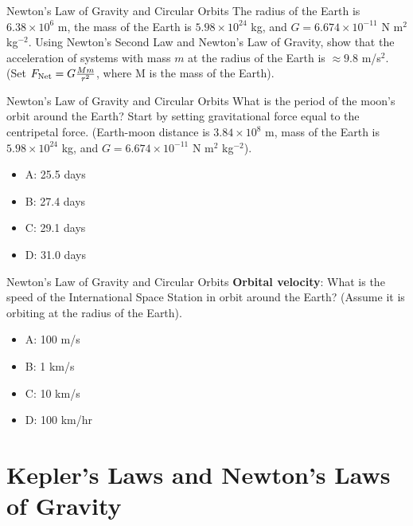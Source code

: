 \documentclass{beamer}
\begin{document}
\begin{frame}{Newton's Law of Gravity and Circular Orbits}
The radius of the Earth is $6.38\times 10^6$ m, the mass of the Earth is $5.98 \times 10^{24}$ kg, and $G = 6.674\times 10^{-11}$ N m$^2$ kg$^{-2}$.  Using Newton's Second Law and Newton's Law of Gravity, show that the acceleration of systems with mass $m$ at the radius of the Earth is $\approx 9.8$ m/s$^2$.\\
\vspace{0.2cm}
(Set $F_{\rm Net} = G\frac{Mm}{r^2}$, where M is the mass of the Earth).
\end{frame}

\begin{frame}{Newton's Law of Gravity and Circular Orbits}
What is the period of the moon's orbit around the Earth?  Start by setting gravitational force equal to the centripetal force.  (Earth-moon distance is $3.84\times 10^8$ m, mass of the Earth is $5.98 \times 10^{24}$ kg, and $G = 6.674\times 10^{-11}$ N m$^2$ kg$^{-2}$).
\begin{itemize}
\item A: 25.5 days
\item B: 27.4 days
\item C: 29.1 days
\item D: 31.0 days
\end{itemize}
\end{frame}

\begin{frame}{Newton's Law of Gravity and Circular Orbits}
\textbf{Orbital velocity}: What is the speed of the International Space Station in orbit around the Earth?  (Assume it is orbiting at the radius of the Earth).
\begin{itemize}
\item A: 100 m/s
\item B: 1 km/s
\item C: 10 km/s
\item D: 100 km/hr
\end{itemize}
\end{frame}

\section{Kepler's Laws and Newton's Laws of Gravity}
\end{document}
